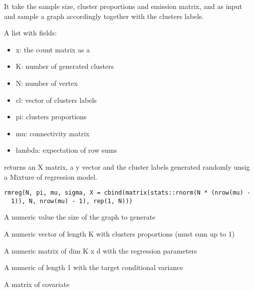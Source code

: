 \documentclass[letterpaper]{book}
\begin{document}
%
\begin{Details}\relax
It take the sample size, cluster proportions and emission matrix, and  as input and sample a graph accordingly together with the clusters labels.
\end{Details}
%
\begin{Value}
A list with fields:
\begin{itemize}

\item x: the count matrix as a 
\item K: number of generated clusters
\item N: number of vertex
\item cl: vector of clusters labels
\item pi: clusters proportions
\item mu: connectivity matrix
\item lambda: expectation of row sums

\end{itemize}

\end{Value}
%
\begin{Description}\relax
{} returns an X matrix, a y vector and the cluster labels generated randomly unsig a Mixture of regression model.
\end{Description}
%
\begin{Usage}
\begin{verbatim}
rmreg(N, pi, mu, sigma, X = cbind(matrix(stats::rnorm(N * (nrow(mu) -
  1)), N, nrow(mu) - 1), rep(1, N)))
\end{verbatim}
\end{Usage}
%
\begin{Arguments}
\begin{ldescription}
\item[\code{N}] A numeric value the size of the graph to generate

\item[\code{pi}] A numeric vector of length K with clusters proportions (must sum up to 1)

\item[\code{mu}] A numeric matrix of dim K x d with the regression parameters

\item[\code{sigma}] A numeric of length 1 with the target conditional variance

\item[\code{X}] A matrix of covariate
\end{ldescription}
\end{Arguments}
\end{document}

